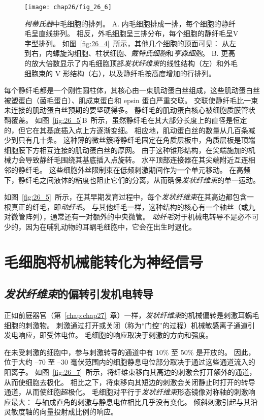 \begin{figure}[htbp]
	\centering
	\texttt{[image: chap26/fig\_26\_6]}
	\caption{\textit{柯蒂氏器}中毛细胞的排列。
		A. 内毛细胞排成一排，每个细胞的静纤毛呈直线排列。 
		相反，外毛细胞呈三排分布，每个细胞的静纤毛呈V字型排列。 
		如图~\ref{fig:26_4}~所示，其他几个细胞的顶面可见：
		从左到右，内螺旋沟细胞、柱状细胞、\textit{戴特氏细胞}和\textit{亨森细胞}。
		B. 更高的放大倍数显示了内毛细胞顶部\textit{发状纤维束}的线性结构（左）和外毛细胞束的 V 形结构（右），以及静纤毛按高度增加的行排列。}
	\label{fig:26_6}
\end{figure}


每个静纤毛都是一个刚性圆柱体，其核心由一束肌动蛋白丝组成，这些肌动蛋白丝被塑蛋白（菌毛蛋白）、肌成束蛋白和 epsin 蛋白严重交联。
交联使静纤毛比一束未连接的肌动蛋白丝预期的要坚硬得多。
静纤毛的肌动蛋白核心被细胞质膜管状鞘覆盖。
如图~\ref{fig:26_5}B~所示，虽然静纤毛在其大部分长度上的直径是恒定的，但它在其基底插入点上方逐渐变细。
相应地，肌动蛋白丝的数量从几百条减少到只有几十条。 
这种薄的微丝簇将静纤毛固定在角质层板中，角质层板是顶端细胞膜下方相互连接的肌动蛋白丝的厚网。
由于这种锥形结构，在尖端施加的机械力会导致静纤毛围绕其基底插入点旋转。
水平顶部连接器在其尖端附近互连相邻的静纤毛。
这些细胞外丝限制束在低频刺激期间作为一个单元移动。
在高频下，静纤毛之间液体的粘度也阻止它们的分离，从而确保\textit{发状纤维束}的单一运动。


如图~\ref{fig:26_5}~所示，在其早期发育过程中，每个\textit{发状纤维束}在其高边都包含一根真正的纤毛，即\textit{动纤毛}。
与其他纤毛一样，这种结构的核心有一个轴丝（或九对微管阵列），通常还有一对额外的中央微管。
\textit{动纤毛}对于机械电转导不是必不可少的，因为在哺乳动物的耳蜗毛细胞中，它会在出生时退化。



\section{毛细胞将机械能转化为神经信号}

\subsection{\textit{发状纤维束}的偏转引发机电转导}

正如前庭器官（第~\ref{chap:chap27}~章）一样，\textit{发状纤维束}的机械偏转是刺激耳蜗毛细胞的刺激物。
刺激通过打开或关闭（称为“门控”的过程）机械敏感离子通道引发电响应，即受体电位。
毛细胞的响应取决于刺激的方向和强度。


在未受刺激的细胞中，参与刺激转导的通道中有 10\% 至 50\% 是开放的。
因此，位于大约 –70 至 –30 毫伏范围内的细胞静息电位部分取决于通过这些通道流入的阳离子。
如图~\ref{fig:26_7}~所示，将纤维束移向其高边的刺激会打开额外的通道，从而使细胞去极化。
相比之下，将束移向其短边的刺激会关闭静止时打开的转导通道，从而使细胞超极化。
毛细胞对平行于\textit{发状纤维束}形态镜像对称轴的刺激响应最大：
与轴成直角的刺激与静息电位相比几乎没有变化。
倾斜刺激引起与其沿灵敏度轴的向量投射成比例的响应。


